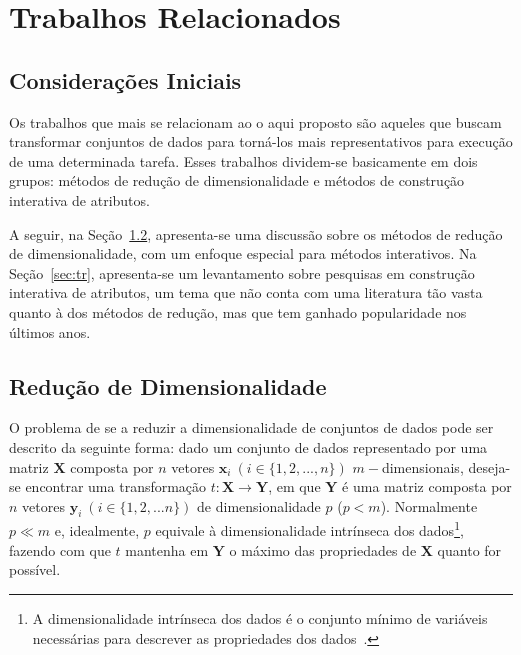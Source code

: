 \chapter{Trabalhos Relacionados}\label{chap:revisao}

\section{Considerações Iniciais}

Os trabalhos que mais se relacionam ao o aqui proposto são
aqueles que buscam transformar conjuntos de dados para
torná-los mais representativos para execução de uma
determinada tarefa. Esses trabalhos dividem-se basicamente
em dois grupos: métodos de redução de dimensionalidade e
métodos de construção interativa de atributos. 

A seguir, na Seção~\ref{sec:rd}, apresenta-se uma discussão
sobre os métodos de redução de dimensionalidade, com um
enfoque especial para métodos interativos. Na
Seção~\ref{sec:tr}, apresenta-se um levantamento sobre
pesquisas em construção interativa de atributos, um tema que
não conta com uma literatura tão vasta quanto à dos métodos
de redução, mas que tem ganhado popularidade nos últimos
anos. 

\section{Redução de Dimensionalidade}\label{sec:rd}

O problema de se a reduzir a dimensionalidade de conjuntos
de dados pode ser descrito da seguinte forma: dado um
conjunto de dados representado por uma matriz $\textbf{X}$
composta por $n$ vetores $\textbf{x}_i~(i \in
\{1,2,...,n\})$ $m-$dimensionais, deseja-se encontrar uma
transformação $t: \textbf{X} \rightarrow \textbf{Y}$, em que
$\textbf{Y}$ é uma matriz composta por $n$ vetores
$\textbf{y}_i~(i \in \{1,2,...n\})$ de dimensionalidade $p$
($p < m$).  Normalmente $p \ll m$ e, idealmente, $p$
equivale à dimensionalidade intrínseca dos dados\footnote{A
dimensionalidade intrínseca dos dados é o conjunto
mínimo de variáveis necessárias para descrever as
propriedades dos dados~\cite{Fukunaga1990}.}, fazendo
com que $t$ mantenha em $\textbf{Y}$ o máximo das
propriedades de $\textbf{X}$ quanto for possível. 

